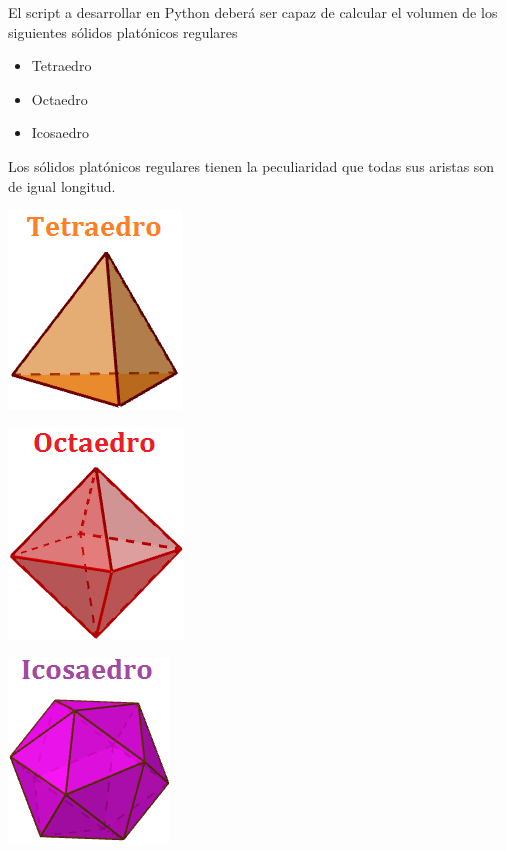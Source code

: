 \documentclass[letterpaper,12pt]{article}
\begin{document}
	El script a desarrollar en Python deberá ser capaz de calcular el volumen de los siguientes sólidos platónicos regulares
	\begin{itemize}
		\item Tetraedro
		\item Octaedro
		\item Icosaedro
	\end{itemize}

	Los sólidos platónicos regulares tienen la peculiaridad que todas sus aristas son de igual longitud.
	
		\begin{center}
			\includegraphics[scale=0.5]{tetraedro.png}
		\end{center}
	\endminipage
		\begin{center}
			\includegraphics[scale=0.5]{octaedro.png}
		\end{center}		
	\endminipage
		\begin{center}
			\includegraphics[scale=0.5]{icosaedro.png}
		\end{center}
	\endminipage
	
\end{document}
